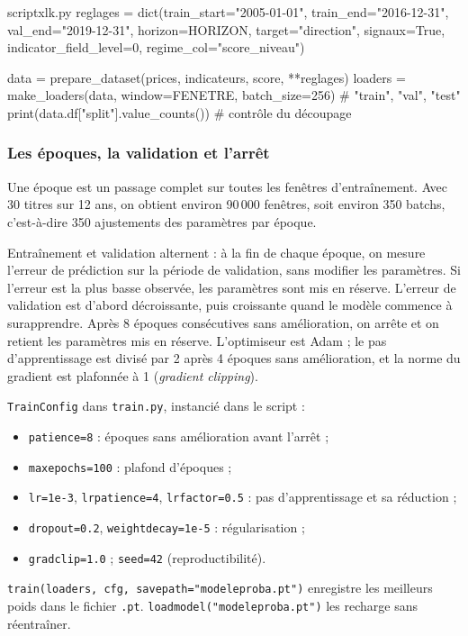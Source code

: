 \documentclass[11pt,a4paper]{article}
\renewcommand{\_}{\usorig\allowbreak}   %
\newcommand{\f}[1]{\texttt{#1}}        %
\begin{document}
\begin{code}{script\_xlk.py}
reglages = dict(train_start="2005-01-01", train_end="2016-12-31", val_end="2019-12-31",
                horizon=HORIZON, target="direction", signaux=True,
                indicator_field_level=0, regime_col="score_niveau")

data    = prepare_dataset(prices, indicateurs, score, **reglages)
loaders = make_loaders(data, window=FENETRE, batch_size=256)   # {"train", "val", "test"}
print(data.df["split"].value_counts())                         # contrôle du découpage
\end{code}

\subsubsection{Les époques, la validation et l'arrêt}\label{sec:epoques}
Une époque est un passage complet sur toutes les fenêtres d'entraînement. Avec 30 titres
sur 12 ans, on obtient environ 90\,000 fenêtres, soit environ 350 batchs, c'est-à-dire
350 ajustements des paramètres par époque.

Entraînement et validation alternent : à la fin de chaque époque, on mesure l'erreur de
prédiction sur la période de validation, sans modifier les paramètres. Si l'erreur est la
plus basse observée, les paramètres sont mis en réserve. L'erreur de validation est
d'abord décroissante, puis croissante quand le modèle commence à surapprendre. Après 8
époques consécutives sans amélioration, on arrête et on retient les paramètres mis en
réserve. L'optimiseur est Adam ; le pas d'apprentissage est divisé par 2 après 4 époques
sans amélioration, et la norme du gradient est plafonnée à 1 (\emph{gradient clipping}).

\begin{danslecode}
\f{TrainConfig} dans \f{train.py}, instancié dans le script :
\begin{itemize}[nosep]
  \item \f{patience=8} : époques sans amélioration avant l'arrêt ;
  \item \f{max\_epochs=100} : plafond d'époques ;
  \item \f{lr=1e-3}, \f{lr\_patience=4}, \f{lr\_factor=0.5} : pas d'apprentissage et sa réduction ;
  \item \f{dropout=0.2}, \f{weight\_decay=1e-5} : régularisation ;
  \item \f{grad\_clip=1.0} ; \f{seed=42} (reproductibilité).
\end{itemize}
\f{train(loaders, cfg, save\_path="modele\_proba.pt")} enregistre les meilleurs poids
dans le fichier \f{.pt}. \f{load\_model("modele\_proba.pt")} les recharge sans réentraîner.
\end{danslecode}
\end{document}
